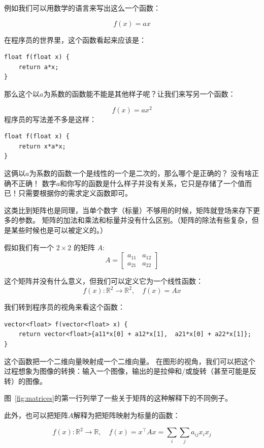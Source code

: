 \documentclass[notitlepage,oneside]{book}
\begin{document}
例如我们可以用数学的语言来写出这么一个函数：

$$
f(x) = ax
$$

在程序员的世界里，这个函数看起来应该是：
\begin{verbatim}
float f(float x) {
    return a*x;
}
\end{verbatim}

那么这个以$a$为系数的函数能不能是其他样子呢？让我们来写另一个函数：

$$
f(x) = ax^2
$$
程序员的写法差不多是这样：
\begin{verbatim}
float f(float x) {
    return x*a*x;
}
\end{verbatim}

这俩以$a$为系数的函数一个是线性的一个是二次的，那么哪个是正确的？ 没有啥正确不正确！
数字$a$和你写的函数是什么样子并没有关系，它只是存储了一个值而已！只需要根据你的需求定义函数即可。

这类比到矩阵也是同理，当单个数字（标量）不够用的时候，矩阵就登场来存下更多的参数。
矩阵的加法和乘法和标量并没有什么区别。（矩阵的除法有些复杂，但是某些时候也是可以被定义的。）


假如我们有一个 $2\times 2$ 的矩阵 $A$:
$$
A=\begin{bmatrix} a_{11} & a_{12} \\ a_{21} & a_{22}\end{bmatrix}
$$

这个矩阵并没有什么意义，但我们可以定义它为一个线性函数：
$$
f(x) : \mathbb R^2 \rightarrow \mathbb R^2, \quad f(x) = Ax
$$

我们转到程序员的视角来看这个函数：
\begin{verbatim}
vector<float> f(vector<float> x) {
    return vector<float>{a11*x[0] + a12*x[1],  a21*x[0] + a22*x[1]};
}
\end{verbatim}

这个函数把一个二维向量映射成一个二维向量。
在图形的视角，我们可以把这个过程想象为图像的转换：输入一个图像，输出的是拉伸和/或旋转（甚至可能是反转）的图像。

图~\ref{fig:matrices}的第一行列举了一些关于矩阵的这种解释下的不同例子。

此外，也可以把矩阵$A$解释为把矩阵映射为标量的函数：

$$
f(x) : \mathbb R^2 \rightarrow \mathbb R, \quad f(x) = x^\top A x = \sum\limits_i\sum\limits_j a_{ij}x_i x_j
$$
\end{document}
